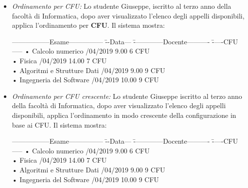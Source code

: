 \begin{itemize}
	\item \textit{Ordinamento per CFU:}
	Lo studente Giuseppe, iscritto al terzo anno della facoltà di Informatica, dopo aver visualizzato l’elenco degli appelli disponibili, applica l’ordinamento per \textbf{CFU}. Il sistema mostra:
	\begin{tabbing}
		\hspace{1cm}-----------------Esame--------------- \= --Data--- \= -------------Docente---------- \= -----CFU-----\kill
		\hspace{1cm} • Calcolo numerico /04/2019 9.00 \> \hspace{2cm} 6 CFU \\
		\hspace{1cm} • Fisica /04/2019 14.00\> \hspace{2cm} 7 CFU  \\
		\hspace{1cm} • Algoritmi e Strutture Dati /04/2019 9.00\> \hspace{2cm} 9 CFU \\
		\hspace{1cm} • Ingegneria del Software /04/2019 10.00 \> \hspace{2cm} 9 CFU \\
	\end{tabbing}
	
	\item \textit{Ordinamento per CFU crescente:}
	Lo studente Giuseppe iscritto al terzo anno della facoltà di Informatica, dopo aver visualizzato l'elenco degli appelli disponibili, applica l'ordinamento in modo crescente della configurazione in base ai CFU. Il sistema mostra:
	\begin{tabbing}
		\hspace{1cm}-----------------Esame--------------- \= --Data--- \= -------------Docente---------- \= -----CFU-----\kill
		\hspace{1cm} • Calcolo numerico /04/2019 9.00 \> \hspace{2cm} 6 CFU \\
		\hspace{1cm} • Fisica /04/2019 14.00\> \hspace{2cm} 7 CFU  \\
		\hspace{1cm} • Algoritmi e Strutture Dati /04/2019 9.00\> \hspace{2cm} 9 CFU \\
		\hspace{1cm} • Ingegneria del Software /04/2019 10.00 \> \hspace{2cm} 9 CFU \\
	\end{tabbing}
	

\end{itemize}

